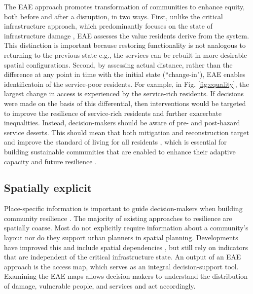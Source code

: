 \documentclass[onecolumn,doublespacing]{risa}
\let \cite \parencite
\begin{document}
The EAE approach promotes transformation of communities to enhance equity, both before and after a disruption, in two ways.
First, unlike the critical infrastructure approach, which predominantly focuses on the state of infrastructure damage \cite{Cutter2010-vg}, EAE assesses the value residents derive from the system. 
This distinction is important because restoring functionality is not analogous to returning to the previous state e.g., the services can be rebuilt in more desirable spatial configurations.
Second, by assessing actual distance, rather than the difference at any point in time with the initial state (``change-in"), EAE enables identificatoin of the service-poor residents. 
For example, in Fig. \ref{fig:equality}, the largest change in access is experienced by the service-rich residents.
If decisions were made on the basis of this differential, then interventions would be targeted to improve the resilience of service-rich residents and further exacerbate inequalities.
Instead, decision-makers should be aware of pre- and post-hazard service deserts. 
This should mean that both mitigation and reconstruction target and improve the standard of living for all residents \cite{Pantelic1991-qu}, which is essential for building sustainable communities that are enabled to enhance their adaptive capacity and future resilience \cite{Saunders2015-uz}.

\subsection{Spatially explicit}
Place-specific information is important to guide decision-makers when building community resilience \cite{Frazier2013-ct}.
The majority of existing approaches to resilience are spatially coarse.
Most do not explicitly require information about a community's layout nor do they support urban planners in spatial planning. 
Developments have improved this and include spatial dependencies \cite{Frazier2013-ct}, but still rely on indicators that are independent of the critical infrastructure state.
An output of an EAE approach is the access map, which serves as an integral decision-support tool.
Examining the EAE maps allows decision-makers to understand the distribution of damage, vulnerable people, and services and act accordingly.
\end{document}
